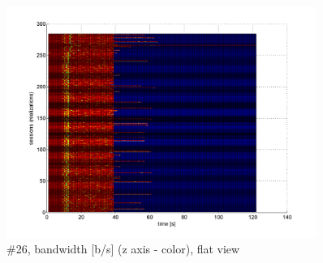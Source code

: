 \begin{figure}[hp]
	\begin{center}
	\includegraphics[width=0.9\textwidth]{results-269-2d.png}
	\end{center}
	\caption[]{\#26, bandwidth [b/s] (z axis - color), flat view}
	\label{img:results-269-2d.png}
\end{figure}
\FloatBarrier
\clearpage

